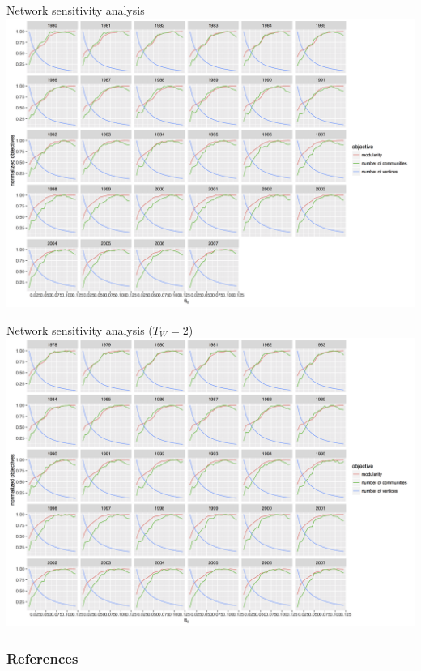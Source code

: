\documentclass{beamer}
\begin{document}
\begin{frame}{Network sensitivity analysis}
	\includegraphics[width=\textwidth]{figures/normalizedObjs-dispth_eth4_1e-5.png}
\end{frame}


\begin{frame}{Network sensitivity analysis ($T_W = 2$)}
	\includegraphics[width=\textwidth]{figures/normalizedObjs-dispth_window3_eth4_1e-5.png}
\end{frame}












\begin{frame}[allowframebreaks]
\frametitle{References}


\end{frame}
\end{document}
